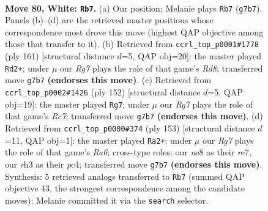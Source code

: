 \documentclass[11pt]{article}
\begin{document}
\clearpage

\begin{figure}[p]\centering
\begin{subfigure}{0.46\textwidth}\centering
\resizebox{\linewidth}{!}{%
\newchessgame
\chessboard[
  setfen={4n3/6R1/3k4/P7/8/7r/4K3/8 w - - 7 80},
  showmover=false,
  pgfstyle=straightmove, color=movearrow, markmove={g7-b7}
]}
\caption{}
\end{subfigure}\hfill
\begin{subfigure}{0.46\textwidth}\centering
\resizebox{\linewidth}{!}{%
\newchessgame
\chessboard[
  setfen={8/k7/7R/p7/8/2N5/5K2/3r4 b - - 11 81},
  showmover=false,
  pgfstyle=straightmove, color=movearrow, markmove={d1-d2}
]}
\caption{}
\end{subfigure}
\\[4pt]
\begin{subfigure}{0.46\textwidth}\centering
\resizebox{\linewidth}{!}{%
\newchessgame
\chessboard[
  setfen={5r2/2R5/8/3n4/8/P4k2/7K/8 w - - 18 77},
  showmover=false,
  pgfstyle=straightmove, color=movearrow, markmove={c7-g7}
]}
\caption{}
\end{subfigure}\hfill
\begin{subfigure}{0.46\textwidth}\centering
\resizebox{\linewidth}{!}{%
\newchessgame
\chessboard[
  setfen={8/4R3/8/2p4k/2P5/r7/4K3/8 b - - 11 77},
  showmover=false,
  pgfstyle=straightmove, color=movearrow, markmove={a3-a2}
]}
\caption{}
\end{subfigure}
\caption{\textbf{Move 80, White: \texttt{Rb7}.} (a) Our position; Melanie plays \texttt{Rb7} (\texttt{g7b7}). Panels (b)--(d) are the retrieved master positions whose correspondence most drove this move (highest QAP objective among those that transfer to it). (b) Retrieved from \texttt{ccrl\_top\_p0001\#1778} (ply 161) [structural distance $d$=5, QAP obj=20]: the master played \texttt{Rd2+}; under $\mu$ our \emph{Rg7} plays the role of that game's \emph{Rd8}; transferred move \texttt{g7b7} \textbf{(endorses this move)}. (c) Retrieved from \texttt{ccrl\_top\_p0002\#1426} (ply 152) [structural distance $d$=5, QAP obj=19]: the master played \texttt{Rg7}; under $\mu$ our \emph{Rg7} plays the role of that game's \emph{Rc7}; transferred move \texttt{g7b7} \textbf{(endorses this move)}. (d) Retrieved from \texttt{ccrl\_top\_p0000\#374} (ply 153) [structural distance $d$=11, QAP obj=1]: the master played \texttt{Ra2+}; under $\mu$ our \emph{Rg7} plays the role of that game's \emph{Ra6}; cross-type roles: our \emph{n}e8 as their \emph{r}e7, our \emph{r}h3 as their \emph{p}c4; transferred move \texttt{g7b7} \textbf{(endorses this move)}. Synthesis: 5 retrieved analogs transferred to \texttt{Rb7} (summed QAP objective 43, the strongest correspondence among the candidate moves); Melanie committed it via the \texttt{search} selector.}
\label{fig:thought-m158}
\end{figure}
\end{document}
